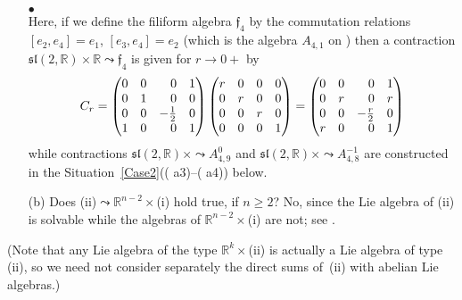 \documentclass[
reqno]{amsart}
\begin{document}
\begin{itemize}
\\ $\bullet$ 
\\ Here, if we define the filiform algebra ${{\mathfrak f}}_4$ by the commutation relations 
$[e_2,e_4]=e_1$, $[e_3,e_4]=e_2$ (which is the algebra $A_{4,1}$ on \cite[pag. 20]{NP06}) 
then a contraction ${{\mathfrak s}{\mathfrak l}}(2,{{\mathbb R}})\times{{\mathbb R}}{\leadsto}{{\mathfrak f}}_4$ is given for $r\to 0+$ by 
$$C_r=
\begin{pmatrix}
 0 & 0 & \hfill 0 & 1 \\
 0 & 1 & \hfill 0 & 0 \\
 0 & 0 & -\frac{1}{2} & 0 \\
 1 & 0 & \hfill 0 & 1 
\end{pmatrix} 
\begin{pmatrix}
  r & 0 & 0 & 0 \\
  0 & r & 0 & 0 \\
  0 & 0 & r & 0 \\
  0 & 0 & 0 & 1 
\end{pmatrix}
=\begin{pmatrix}
       0 & 0 & \hfill 0 & 1\\
\hfill 0 & r & \hfill 0 & r \\
\hfill 0 & 0 & -\frac{r}{2} & 0 \\
\hfill r & 0 & \hfill 0 & 1 
\end{pmatrix}$$
while contractions ${{\mathfrak s}{\mathfrak l}}(2,{{\mathbb R}})\times{\leadsto} A_{4,9}^0$ and ${{\mathfrak s}{\mathfrak l}}(2,{{\mathbb R}})\times{\leadsto} A_{4,8}^{-1}$ 
are constructed in the Situation~\ref{Case2}(({{\bfseries\itshape} a3})--({{\bfseries\itshape} a4})) below.  

\item[(b)] Does (ii)${\leadsto}$${{\mathbb R}}^{n-2}\times$(i) hold true, if $n\ge 2$? 
 No, since the Lie algebra of (ii) is solvable while the algebras of ${{\mathbb R}}^{n-2}\times$(i) are not; 
see \cite[Th. 1(13)]{NP06}. 
\end{itemize}
(Note that any Lie algebra of the type ${{\mathbb R}}^k\times$(ii) is actually a Lie algebra of type (ii), 
so we need not consider separately the direct sums of~(ii) 
with abelian Lie algebras.)
\end{document}
